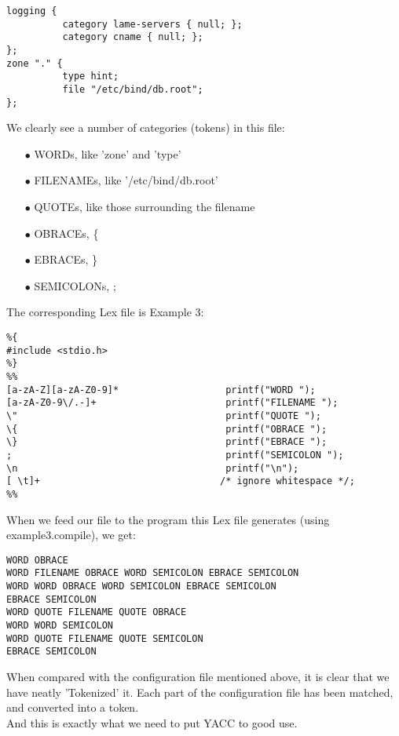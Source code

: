\documentclass{article}
\begin{document}
\begin{verbatim}
logging {
          category lame-servers { null; };
          category cname { null; };	
};
zone "." {
          type hint;
          file "/etc/bind/db.root";
};
\end{verbatim}
We clearly see a number of categories (tokens) in this file:
\begin{itemize}
\item[$\bullet$] WORDs, like 'zone' and 'type'
\item[$\bullet$] FILENAMEs, like ’/etc/bind/db.root’
\item[$\bullet$] QUOTEs, like those surrounding the filename
\item[$\bullet$] OBRACEs, \{
\item[$\bullet$] EBRACEs, \}
\item[$\bullet$] SEMICOLONs, ;
\end{itemize}
The corresponding Lex file is Example 3:
\begin{verbatim}
%{
#include <stdio.h>
%}
%%
[a-zA-Z][a-zA-Z0-9]*                   printf("WORD ");
[a-zA-Z0-9\/.-]+                       printf("FILENAME ");
\"                                     printf("QUOTE ");
\{                                     printf("OBRACE ");
\}                                     printf("EBRACE ");
;                                      printf("SEMICOLON ");
\n                                     printf("\n");
[ \t]+                                /* ignore whitespace */;
%%
\end{verbatim}
When we feed our file to the program this Lex file generates (using example3.compile), we get:
\begin{verbatim}
WORD OBRACE
WORD FILENAME OBRACE WORD SEMICOLON EBRACE SEMICOLON
WORD WORD OBRACE WORD SEMICOLON EBRACE SEMICOLON
EBRACE SEMICOLON
WORD QUOTE FILENAME QUOTE OBRACE
WORD WORD SEMICOLON
WORD QUOTE FILENAME QUOTE SEMICOLON
EBRACE SEMICOLON
\end{verbatim}
When compared with the configuration file mentioned above, it is clear that we have neatly ’Tokenized’ it.
Each part of the configuration file has been matched, and converted into a token.\\
And this is exactly what we need to put YACC to good use.
\end{document}
